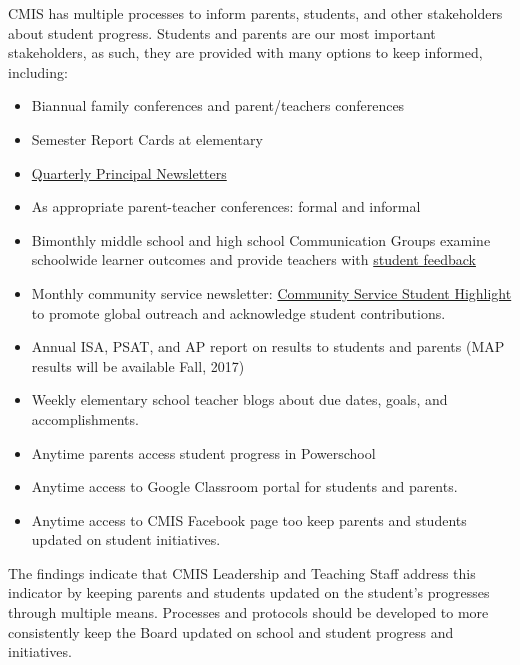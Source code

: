 \begin{findings}
CMIS has multiple processes to inform parents, students, and other stakeholders about student progress. Students and parents are our most important stakeholders, as such, they are provided with many options to keep informed, including: 

\begin{itemize}
\item Biannual family conferences and parent/teachers conferences 
\item Semester Report Cards at elementary
\item \href{https://docs.google.com/a/cmis.ac.th/document/d/1tKgWA7BvpUl5AtPuYD3R3l_bjcqtlilUjVF8mPIiwWA/edit?usp=sharing}{Quarterly Principal Newsletters}
\item As appropriate parent-teacher conferences: formal and informal
\item Bimonthly middle school and high school Communication Groups examine schoolwide learner outcomes and provide teachers with \href{https://docs.google.com/a/cmis.ac.th/presentation/d/1Vivhd6yh4v13MAs9SQlb1j-V6un3hyPROEjYk242zkg/edit?usp=sharing}{student feedback}
\item Monthly community service newsletter: \href{http://blogs.cmis.ac.th/community-service/}{Community Service Student Highlight} to promote global outreach and acknowledge student contributions.
\item Annual ISA, PSAT, and AP report on results to students and parents (MAP results will be available Fall, 2017)
\item Weekly elementary school teacher blogs about due dates, goals, and accomplishments.
\item Anytime parents access student progress in Powerschool  
\item Anytime access to Google Classroom portal for students and parents. 
\item Anytime access to CMIS Facebook page too keep parents and students updated on student initiatives. 
\end{itemize}



The findings indicate that CMIS Leadership and Teaching Staff address this indicator by keeping parents and students updated on the student’s progresses through multiple means. Processes and protocols should be developed to more consistently keep the Board updated on school and student progress and initiatives. 
\end{findings}

